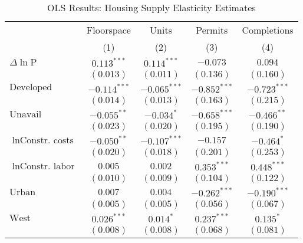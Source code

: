 
\begin{table}
\caption{OLS Results: Housing Supply Elasticity Estimates}
\begin{center}
\begin{footnotesize}
\begin{threeparttable}
\begin{tabular}{l c c c c}
\toprule
 & \multicolumn{1}{c}{Floorspace} & \multicolumn{1}{c}{Units} & \multicolumn{1}{c}{Permits} & \multicolumn{1}{c}{Completions} \\
\cmidrule(lr){2-2} \cmidrule(lr){3-3} \cmidrule(lr){4-4} \cmidrule(lr){5-5}
 & (1) & (2) & (3) & (4) \\
\midrule
$\Delta\ln{\text{P}}$       & $0.113^{***}$  & $0.114^{***}$  & $-0.073$       & $0.094$        \\
                            & $(0.013)$      & $(0.011)$      & $(0.136)$      & $(0.160)$      \\
$\text{Developed}$          & $-0.114^{***}$ & $-0.065^{***}$ & $-0.852^{***}$ & $-0.723^{***}$ \\
                            & $(0.014)$      & $(0.013)$      & $(0.163)$      & $(0.215)$      \\
$\text{Unavail}$            & $-0.055^{**}$  & $-0.034^{*}$   & $-0.658^{***}$ & $-0.466^{**}$  \\
                            & $(0.023)$      & $(0.020)$      & $(0.195)$      & $(0.190)$      \\
$\ln{\text{Constr. costs}}$ & $-0.050^{**}$  & $-0.107^{***}$ & $-0.157$       & $-0.464^{*}$   \\
                            & $(0.020)$      & $(0.018)$      & $(0.201)$      & $(0.253)$      \\
$\ln{\text{Constr. labor}}$ & $0.005$        & $0.002$        & $0.353^{***}$  & $0.448^{***}$  \\
                            & $(0.010)$      & $(0.009)$      & $(0.104)$      & $(0.122)$      \\
$\text{Urban}$              & $0.007$        & $0.004$        & $-0.262^{***}$ & $-0.190^{***}$ \\
                            & $(0.005)$      & $(0.005)$      & $(0.056)$      & $(0.067)$      \\
$\text{West}$               & $0.026^{***}$  & $0.014^{*}$    & $0.237^{***}$  & $0.135^{*}$    \\
                            & $(0.008)$      & $(0.008)$      & $(0.068)$      & $(0.081)$      \\

\end{tabular}
\end{threeparttable}
\end{footnotesize}
\end{center}
\end{table}
